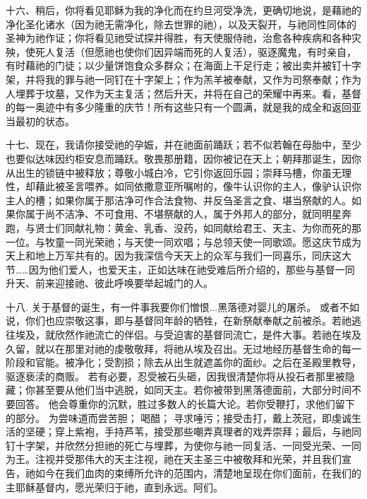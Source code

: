 十六、稍后，你将看见耶稣为我的净化而在约旦河受净洗，更确切地说，是藉祂的净化圣化诸水（因为祂无需净化，除去世罪的祂），以及天裂开，与祂同性同体的圣神为祂作证；你将看见祂受试探并得胜，有天使服侍祂，治愈各种疾病和各种灾殃，使死人复活（但愿祂也使你们因异端而死的人复活），驱逐魔鬼，有时亲自，有时藉祂的门徒；以少量饼饱食众多群众；在海面上干足行走；被出卖并被钉十字架，并将我的罪与祂一同钉在十字架上；作为羔羊被奉献，又作为司祭奉献；作为人埋葬于坟墓，又作为天主复活；然后升天，并将在自己的荣耀中再来。看，基督的每一奥迹中有多少隆重的庆节！所有这些只有一个圆满，就是我的成全和返回亚当最初的状态。\par

十七、现在，我请你接受祂的孕娠，并在祂面前踊跃；若不似若翰在母胎中，至少也要似达味因约柜安息而踊跃。敬畏那册籍，因你被记在天上；朝拜那诞生，因你从出生的锁链中被释放；尊敬小城白冷，它引你返回乐园；崇拜马槽，你虽无理性，却藉此被圣言喂养。如同依撒意亚所嘱咐的，像牛认识你的主人，像驴认识你主人的槽；如果你属于那洁净可作合法食物、并反刍圣言之食、堪当祭献的人。如果你属于尚不洁净、不可食用、不堪祭献的人，属于外邦人的部分，就同明星奔跑，与贤士们同献礼物：黄金、乳香、没药，如同献给君王、天主、为你而死的那一位。与牧童一同光荣祂；与天使一同欢唱；与总领天使一同歌颂。愿这庆节成为天上和地上万军共有的。因为我深信今天天上的众军与我们一同喜乐，同庆这大节……因为他们爱人，也爱天主，正如达味在祂受难后所介绍的，那些与基督一同升天、前来迎接祂、彼此呼唤要举起城门的人。\par

十八. 关于基督的诞生，有一件事我要你们憎恨...黑落德对婴儿的屠杀。 或者不如说，你们也应崇敬这事，即与基督同年龄的牺牲，在新祭献奉献之前被杀。若祂逃往埃及，就欣然作祂流亡的伴侣。与受迫害的基督同流亡，是件大事。若祂在埃及久留，就以在那里对祂的虔敬敬拜，将祂从埃及召出。无过地经历基督生命的每一阶段和官能。被净化；受割损；除去从出生就遮盖你的面纱。之后在圣殿里教导，驱逐亵渎的商贩。 若有必要，忍受被石头砸，因我很清楚你将从投石者那里被隐藏；你甚至要从他们当中逃脱，如同天主。若你被带到黑落德面前，大部分时间不要回答。 他会尊重你的沉默，胜过多数人的长篇大论。若你受鞭打，求他们留下的部分。 为尝味道而尝苦胆； 喝醋； 寻求唾污；接受击打，戴上茨冠，即虔诚生活的坚硬；穿上紫袍，手持芦苇，接受那些嘲弄真理者的戏弄崇拜；最后，与祂同钉十字架，并欣然分担祂的死亡与埋葬，为使你与祂一同复活、一同受光荣、一同为王。注视并受那伟大的天主注视，祂在天主圣三中被敬拜和光荣，并且我们宣告，祂如今在我们血肉的束缚所允许的范围内，清楚地呈现在你们面前，在我们的主耶稣基督内，愿光荣归于祂，直到永远。阿们。\par


